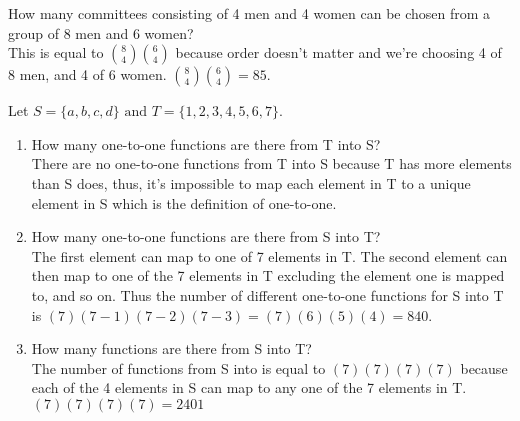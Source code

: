 \documentclass[12pt]{article}
\newcommand{\be}{\begin{enumerate}}
\newcommand{\ee}{\end{enumerate}}
\newcommand{\seti}[1]{\setcounter{enumi}{#1}}
\newcommand{\tand}{\text{ and }}
\begin{document}
\seti{7}
\item How many committees consisting of 4 men and 4 women can be chosen from a group of 8 men and 6 women?\\
	This is equal to ${8\choose4}{6\choose4}$ because order doesn't matter and we're choosing 4 of 8 men, and 4 of 6 women.
	${8\choose4}{6\choose4}=85$.

\item Let $S=\{a,b,c,d\}\tand T=\{1,2,3,4,5,6,7\}$.
	\be
	\item How many one-to-one functions are there from T into S?\\
	There are no one-to-one functions from T into S because T has more elements than S does, thus, it's impossible to map each 
	element in T to a unique element in S which is the definition of one-to-one.
	\item How many one-to-one functions are there from S into T?\\
	The first element can map to one of 7 elements in T. The second element can then map to one of the 7 elements in T excluding 		the element one is mapped to, and so on. Thus the number of different one-to-one functions for S into T is 
	$(7)(7-1)(7-2)(7-3)=(7)(6)(5)(4)=840$.
	\item How many functions are there from S into T?\\
	The number of functions from S into is equal to $(7)(7)(7)(7)$ because each of the 4 elements in S can map to any one of the 
	7 elements in T. $(7)(7)(7)(7)=2401$
	\ee
\end{document}
